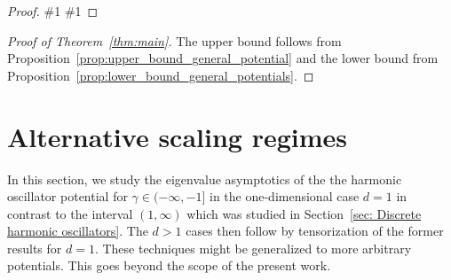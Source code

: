 \documentclass[12pt, reqno]{amsart}
\theoremstyle{definition}
\numberwithin{equation}{section}
\newcommand{\lorenzorrection}[1]{\#1}%
\begin{document}
\begin{proof}
\lorenzorrection{Now, we estimate the second term $ \sum_{l} \eta_l H_{N,l} \eta_l $. We let a number $r$ such that $e_{n-1}(V) < r < e_{n}(V)$ be given and denote by
$P_{N,n-1,l}$  the orthogonal projection onto the span of the eigenfunctions of $H_{N,l}$  having energy less or equal than $\lambda_Nr$ and $P_{N,0,l}=0$. Thus, by induction hypothesis and the eigenvalue asymptotics of the harmonic oscillator, Theorem~\ref{thm:eigenvalue_asymptotics_harmonic_oscillator_main}, we have that the sum  $\sum_l P_{N,n-1,l}$ has rank at most $n-1$ for $N$ large enough and trivially $ P_{N,0,l} $ has rank $0$ which is needed for the base case.}
\lorenzorrection{Then,  we have
    \begin{align*}
        H_{N,l} &\geq \lambda_N r(I-P_{N,n-1,l}) + P_{N,n-1,l}H_{N,l}P_{N,n-1,l} + o(\lambda_N)\\&= \lambda_N r+ P_{N,n-1,l}(H_{N,l}-\lambda_N r)P_{N,n-1,l} + o(\lambda_N).
    \end{align*}
Now, the operator
\begin{align*}
  Q_{N,n-1}=  \sum_{l=1}^m \eta_l P_{N,n,l}(H_{N,l}-\lambda_N r)P_{N,n,l} \eta_l 
\end{align*}
has rank at most $n-1$ as discussed above.
Thus, taking all estimates together, we obtain
    \begin{align*}
        H_N \geq \lambda_N r + Q_{N,n-1} + o(\lambda_N).
    \end{align*}
    By the min-max principle and  since $r$ can be chosen arbitrarily close to $e_n(V)$, this yields the desired lower bound on the eigenvalues.}    
\end{proof}

\begin{proof}
[Proof of Theorem~\ref{thm:main}]
The upper bound follows from Proposition~\ref{prop:upper_bound_general_potential} and the lower bound from Proposition~\ref{prop:lower_bound_general_potentials}.
\end{proof}

\section{Alternative scaling regimes}\label{sec: Alternative regions}
In this section, we study the eigenvalue asymptotics of the the harmonic oscillator potential for $\gamma \in (-\infty, -1 ]$ in the one-dimensional case $d=1$ in contrast to the interval $ (1,\infty) $ which was studied in Section~\ref{sec: Discrete harmonic oscillators}. The $d>1$ cases then follow by tensorization of the former results for $d=1$. These techniques might be generalized to more arbitrary potentials. This goes beyond the scope of the present work.
\end{document}
